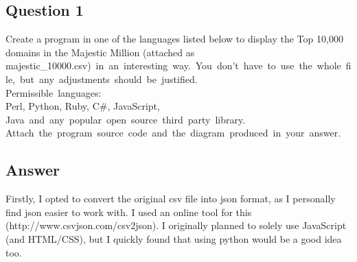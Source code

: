\documentclass{article}
\begin{document}
\subsection{Question 1}
Create a program in one of the languages listed below to display the Top 10,000 domains in the Majestic Million (attached as majestic\_10000.csv)\ in\ an\ interesting\ way.\ You\ don’t\ have\ to\ use\ the\ whole\ file,\ but\ any\ adjustments\ should\ be\ justified. \\
\newline
Permissible\ languages: \\
\newline
Perl, Python, Ruby, C\#, JavaScript, Java\ and\ any\ popular\ open\ source\ third\ party\ library.
\\
\newline
Attach\ the\ program\ source\ code\ and\ the\ diagram\ produced\ in\ your\ answer.

\subsection{Answer}

Firstly, I opted to convert the original csv file into json format, as I personally find json easier to work with. I used an online tool for this (http://www.csvjson.com/csv2json). I originally planned to solely use JavaScript (and HTML/CSS), but I quickly found that using python would be a good idea too.
\end{document}
